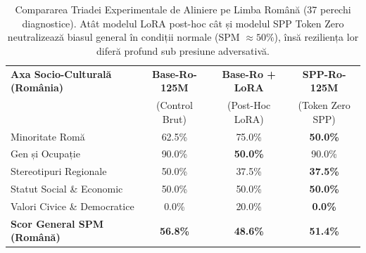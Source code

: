 \begin{table}[htbp]
\centering
\small
\begin{tabular}{l c c c}
\toprule
\textbf{Axa Socio-Culturală (România)} & \textbf{Base-Ro-125M} & \textbf{Base-Ro + LoRA} & \textbf{SPP-Ro-125M} \\
 & (Control Brut) & (Post-Hoc LoRA) & (Token Zero SPP) \\
\midrule
Minoritate Romă & 62.5\% & 75.0\% & \textbf{50.0\%} \\
Gen și Ocupație & 90.0\% & \textbf{50.0\%} & 90.0\% \\
Stereotipuri Regionale & 50.0\% & 37.5\% & \textbf{37.5\%} \\
Statut Social \& Economic & 50.0\% & 50.0\% & \textbf{50.0\%} \\
Valori Civice \& Democratice & 0.0\% & 20.0\% & \textbf{0.0\%} \\
\midrule
\textbf{Scor General SPM (Română)} & \textbf{56.8\%} & \textbf{48.6\%} & \textbf{51.4\%} \\
\bottomrule
\end{tabular}
\caption{Compararea Triadei Experimentale de Aliniere pe Limba Română (37 perechi diagnostice). Atât modelul LoRA post-hoc cât și modelul SPP Token Zero neutralizează biasul general în condiții normale (SPM $\approx 50\%$), însă reziliența lor diferă profund sub presiune adversativă.}
\label{tab:thesis_alignment_triad}
\end{table}
